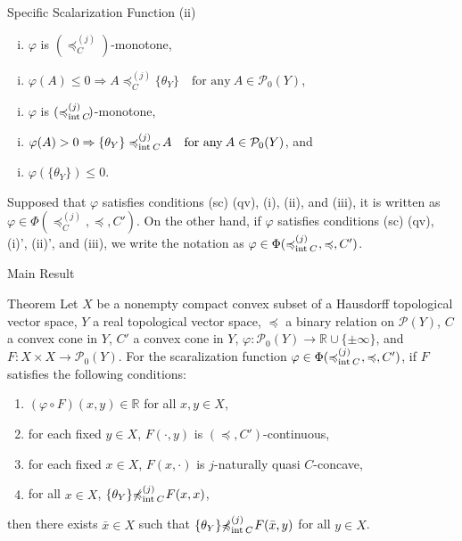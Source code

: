 \documentclass[aspectratio=169, dvipdfmx, 11pt]{beamer}
\newcommand{\RealNumberSet}{\mathbb{R}}
\newcommand{\Interior}[1]{\text{\rm int\:${#1}$}} %
\newcommand{\pow}[1]{\mathcal{P}_{0}(#1)}
\newcommand{\setrel}[2]{\preccurlyeq^{(#1)}_{#2}\!}
\newcommand{\notsetrel}[2]{{\not\preccurlyeq}^{(#1)}_{#2}\!}
\begin{document}
\begin{frame}{Specific Scalarization Function (ii)}
  \begin{enumerate}[(i)]
    \item $\varphi$ is $(\setrel{j}{C})$-monotone,
  \end{enumerate}
  \begin{enumerate}[(ii)]
    \item $\varphi (A) \leq 0 \Rightarrow  A \setrel{j}{C} \{\theta_Y\}\quad\text{for any}\:A\in \pow{Y}$,
  \end{enumerate}

  \begin{enumerate}[(i)']
    \item $\varphi$ is $(\setrel{j}{\Interior{C}})$-monotone,
  \end{enumerate}
  \begin{enumerate}[(ii)']
    \item $\varphi (A) > 0 \Rightarrow  \{\theta_Y\} \setrel{j}{\Interior{C}} A \quad\text{for any}\:A\in \pow{Y}$, and
  \end{enumerate}
  \begin{enumerate}[(iii)]
    \item $\varphi(\{\theta_{Y}\}) \leq 0$.
  \end{enumerate}
  Supposed that $\varphi$ satisfies conditions (sc) (qv), (i), (ii), and (iii),
  it is written as $\varphi \in \Phi(\setrel{j}{C}, \preccurlyeq, C')$. On the other hand,
  if $\varphi$ satisfies conditions (sc) (qv), (i)', (ii)', and (iii),
  we write the notation as $\varphi \in \Phi(\setrel{j}{\Interior{C}}\:, \preccurlyeq, C')$.
\end{frame}

\begin{frame}{Main Result}
  \begin{block}{Theorem}
    Let $X$ be a nonempty compact convex subset of a Hausdorff topological vector space,
    $Y$ a real topological vector space, $\preccurlyeq$ a binary relation on $\mathcal{P}(Y)$,
    $C$ a convex cone in $Y$, $C'$ a convex cone in $Y$,
    $\varphi\colon \pow{Y} \to \RealNumberSet \cup \{\pm \infty\}$,
    and $F\colon X \times X \to \pow{Y}$.
    For the scaralization function $\varphi \in \Phi(\setrel{j}{\Interior{C}}\:, \preccurlyeq, C')$,
    if $F$ satisfies the following conditions:
    \begin{enumerate}
      \item $(\varphi \circ F)(x,y) \in \RealNumberSet$ for all $x,y \in X$,
      \item for each fixed $y \in X$, $F(\cdot,y)$ is $(\preccurlyeq, C')$-continuous,
      \item for each fixed $x \in X$, $F(x,\cdot)$ is $j$-naturally quasi $C$-concave,
      \item for all $x \in X$, $\{\theta_Y\} \notsetrel{j}{\Interior{C}}\: F(x,x) $,
    \end{enumerate}
    then there exists $\bar{x} \in X$ such that $\{\theta_Y\} \notsetrel{j}{\Interior{C}}\: F(\bar{x},y)$
    for all $y \in X$.
  \end{block}
\end{frame}
\end{document}
